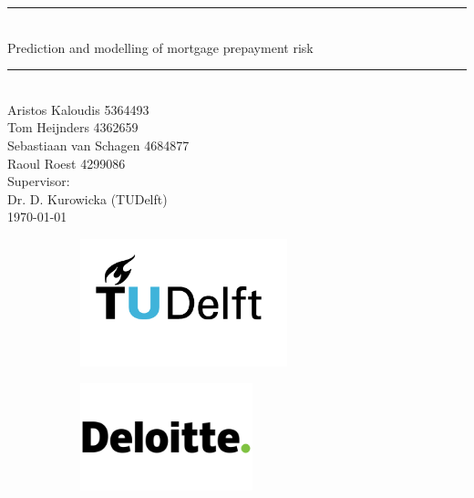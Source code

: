 \documentclass[11pt,titlepage,a4paper]{article}
\begin{document}
    \begin{titlepage}
        \vspace*{\fill}
        \centering
        \par\noindent\rule{\textwidth}{0.4pt} \\[0.7cm]
        
        {
            \Huge Prediction and modelling of mortgage prepayment risk
        }\\[0.5cm]
        
        \par\noindent\rule{\textwidth}{0.4pt}\\[1cm]
        
        {\large 
            Aristos Kaloudis 5364493 \\
            Tom Heijnders 4362659 \\
            Sebastiaan van Schagen 4684877 \\
            Raoul Roest 4299086
        }\\[0.6cm]

        {
            \large Supervisor:\\ 
            Dr. D. Kurowicka (TUDelft)
        }\\[1cm]
        
        \today\\[5cm]
        
        \begin{figure}[h]    
            \centering
            \begin{subfigure}{0.45\textwidth}
                \includegraphics[width=6cm]{Figures/TU_Delft_logo_RGB.png}
            \end{subfigure}
    
            \begin{subfigure}{0.45\textwidth}
                \includegraphics[width=5cm]{Figures/Logo_Deloitte.png}
            \end{subfigure}
        \end{figure}
    
        \vfill
    
    \end{titlepage}
\end{document}

